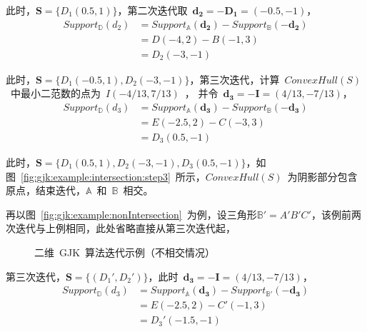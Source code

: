 此时，$\bm{S} = \{D_1(0.5, 1)\}$，第二次迭代取~$\bm{d_2}=-\bm{D_1}=(-0.5, -1)$，
\begin{equation}
  \begin{array}{ll}
  Support_\mathbb{D}(d_2)  & = Support_\mathbb{A}(\bm{d_2}) - Support_\mathbb{B}(-\bm{d_2}) \\
    & = D(-4, 2) - B(-1, 3) \\
    & = D_2(-3, -1)
  \end{array}
  \label{euqa:gjk:step2}
\end{equation}

此时，$\bm{S} = \{D_1(-0.5, 1), D_2(-3, -1)\}$，第三次迭代，计算~$ConvexHull(S)$~中最小二范数的点为~$I(-4/13, 7/13)$~，
并令~$\bm{d_3}=-\bm{I}=(4/13, -7/13)$，
\begin{equation}
  \begin{array}{ll}
  Support_\mathbb{D}(d_3)  & = Support_\mathbb{A}(\bm{d_3}) - Support_\mathbb{B}(-\bm{d_3}) \\
    & = E(-2.5, 2) - C(-3, 3) \\
    & = D_3(0.5, -1)
  \end{array}
  \label{euqa:gjk:step3}
\end{equation}

此时，$\bm{S} = \{D_1(0.5, 1), D_2(-3, -1), D_3(0.5, -1)\}$，如图~\ref{fig:gjk:example:intersection:step3}~所示，$ConvexHull(S)$~为阴影部分包含原点，结束迭代，$\mathbb{A}$~和~$\mathbb{B}$~相交。

再以图~\ref{fig:gjk:example:nonIntersection}~为例，设三角形$\mathbb{B'} = A'B'C'$，该例前两次迭代与上例相同，此处省略直接从第三次迭代起，

\begin{figure}[htb]
\centering
{} 
\caption{二维~GJK~算法迭代示例（不相交情况）}
\label{fig:gjk:example:2d:intersection:iterator}
\end{figure}

第三次迭代，$\bm{S} = \{(D_1', D_2') \}$，此时~$\bm{d_3}=-\bm{I}=(4/13, -7/13)$，
\begin{equation}
  \begin{array}{ll}
  Support_\mathbb{D}(d_3)  & = Support_\mathbb{A}(\bm{d_3}) - Support_\mathbb{B'}(-\bm{d_3}) \\
    & = E(-2.5, 2) - C'(-1, 3) \\
    & = D_3'(-1.5, -1)
  \end{array}
  \label{euqa:gjk:non:step3}
\end{equation}

